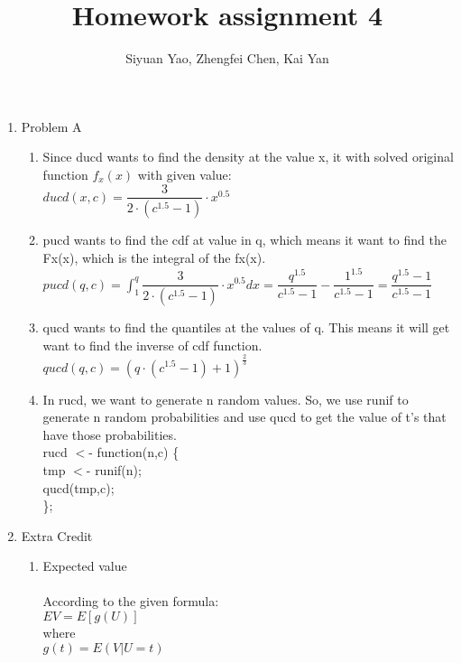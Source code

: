 \documentclass{amsart}
\newcommand\tab[1][1cm]{\hspace*{#1}}
\begin{document}
\title{Homework assignment 4}
\author{Siyuan Yao, Zhengfei Chen, Kai Yan}
\maketitle

\thispagestyle{empty}
\pagestyle{empty}

\begin{enumerate}
\item Problem A\\
\begin{enumerate}
\item Since ducd wants to find the density at the value x, it with solved original function $f_x(x)$ with given value:\\
$ducd(x,c)=\dfrac{3}{2\cdot(c^{1.5}-1)}\cdot x^{0.5}$\\
\item pucd wants to find the cdf at value in q, which means it want to find the Fx(x), which is the integral of the fx(x).\\
$pucd(q,c)=\displaystyle\int^{q}_{1} \dfrac{3}{2\cdot(c^{1.5}-1)}\cdot x^{0.5} dx=\dfrac{q^{1.5}}{c^{1.5}-1}-\dfrac{1^{1.5}}{c^{1.5}-1}=\dfrac{q^{1.5}-1}{c^{1.5}-1}$\\
\item qucd wants to find the quantiles at the values of q. This means it will get want to find the inverse of cdf function.\\
$qucd(q,c)=(q\cdot(c^{1.5}-1)+1)^{\frac{2}{3}}$\\
\item In rucd, we want to generate n random values. So, we use runif to generate n random probabilities and use qucd to get the value of t's that have those probabilities.\\
rucd $<$- function(n,c) \{\\
\tab tmp $<$- runif(n);\\
\tab qucd(tmp,c);\\
\};\\
\end{enumerate}
\newpage
\item Extra Credit
\begin{enumerate}
\item Expected value\\\\
According to the given formula:\\
$ EV = E[g(U)]$\\
where \\$g(t) = E(V | U = t)$\\

\end{enumerate}
\end{enumerate}
\end{document}
